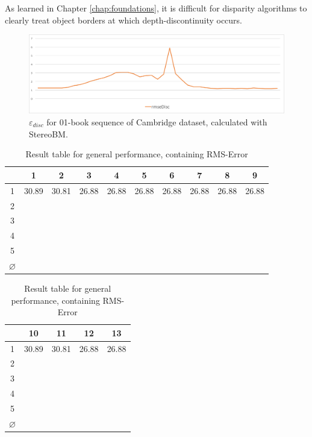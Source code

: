 \noindent As learned in Chapter \ref{chap:foundations}, it is difficult for disparity algorithms to clearly treat object borders at which depth-discontinuity occurs.

\begin{figure}[h!]
  \centering
  \includegraphics[width=1.0\textwidth]{src/images/evaluation/outliers/plot1.pdf}
  \caption{$\varepsilon_{disc}$ for 01-book sequence of Cambridge dataset, calculated with StereoBM.}
  \label{fig:plot1}
\end{figure}


\begin{table}[]
\centering
\begin{tabular}{c|ccccccccc}
  & 1 & 2 & 3 & 4 & 5 & 6 & 7 & 8 & 9 \\ \hline
1 & 30.89 & 30.81 & 26.88 & 26.88 & 26.88 & 26.88 & 26.88 & 26.88 & 26.88 \\
2 &   &   &   &   &   &   &   &   &  \\
3 &   &   &   &   &   &   &   &   &  \\
4 &   &   &   &   &   &   &   &   &  \\
5 &   &   &   &   &   &   &   &   &  \\ \hline
$\varnothing$ &   &   &   &   &   &   &   &   & 
\end{tabular}
\caption{Result table for general performance, containing RMS-Error}
\end{table}

\begin{table}[]
\centering
\begin{tabular}{c|cccc}
  & 10 & 11 & 12 & 13 \\ \hline
1 & 30.89 & 30.81 & 26.88 & 26.88 \\
2 &   &   &   &  \\
3 &   &   &   &  \\
4 &   &   &   &  \\
5 &   &   &   &  \\ \hline
$\varnothing$ &   &   &   & 
\end{tabular}
\caption{Result table for general performance, containing RMS-Error}
\end{table}

